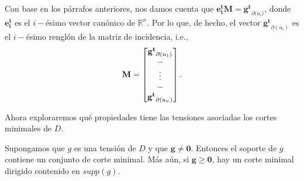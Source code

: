 Con base en los párrafos anteriores, nos damos cuenta que $\mathbf{e^{t}_{i}}\mathbf{M} = \mathbf{g^{t}}_{\partial({u_{i})}}$, donde $\mathbf{e^{t}_{i}}$ es el $i-$ésimo vector canónico de $\mathbb{R}^{n}$. Por lo que, de hecho, el vector $\mathbf{g^{t}}_{\partial{(u_{i})}}$ es el $i-$ésimo  renglón de la matriz de incidencia, i.e.,
$$
\mathbf{M} = \begin{bmatrix}
\mathbf{g^{t}}_{\partial(u_{1})} \\
\-- \\
\vdots \\
\--\\
\mathbf{g^{t}}_{\partial(u_{n})}
\end{bmatrix}.
$$

Ahora exploraremos qué propiedades tiene las tensiones asociadas los cortes minimales de $D$.

\begin{lema}
Supongamos que $g$ es una tensión de $D$ y que $\mathbf{g} \neq \mathbf{0}$. Entonces el soporte de $g$ contiene un conjunto de corte minimal. Más aún, si $\mathbf{g} \geq \mathbf{0}$, hay un corte minimal dirigido contenido en $supp(g)$.
\end{lema}

